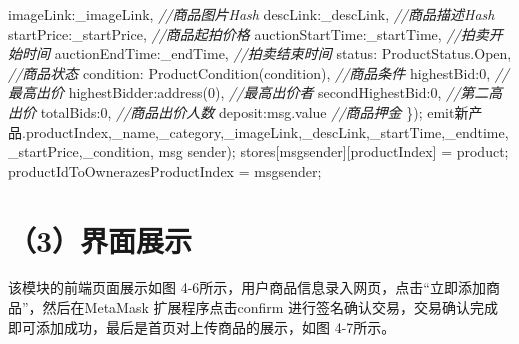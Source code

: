 \documentclass[
  10
]{article}
\newenvironment{Shaded}{}{}
\newcommand{\AttributeTok}[1]{\textcolor[rgb]{0.49,0.56,0.16}{#1}}
\newcommand{\CommentTok}[1]{\textcolor[rgb]{0.38,0.63,0.69}{\textit{#1}}}
\newcommand{\DecValTok}[1]{\textcolor[rgb]{0.25,0.63,0.44}{#1}}
\newcommand{\FunctionTok}[1]{\textcolor[rgb]{0.02,0.16,0.49}{#1}}
\newcommand{\NormalTok}[1]{#1}
\newcommand{\OperatorTok}[1]{\textcolor[rgb]{0.40,0.40,0.40}{#1}}
\begin{document}
\begin{Shaded}
\begin{Highlighting}[]
\NormalTok{imageLink}\OperatorTok{:}\NormalTok{\_imageLink}\OperatorTok{,} \CommentTok{//商品图片Hash  }
\NormalTok{descLink}\OperatorTok{:}\NormalTok{\_descLink}\OperatorTok{,} \CommentTok{//商品描述Hash  }
\NormalTok{startPrice}\OperatorTok{:}\NormalTok{\_startPrice}\OperatorTok{,} \CommentTok{//商品起拍价格  }
\NormalTok{auctionStartTime}\OperatorTok{:}\NormalTok{\_startTime}\OperatorTok{,} \CommentTok{//拍卖开始时间  }
\NormalTok{auctionEndTime}\OperatorTok{:}\NormalTok{\_endTime}\OperatorTok{,} \CommentTok{//拍卖结束时间  }
\NormalTok{status}\OperatorTok{:}\NormalTok{ ProductStatus}\OperatorTok{.}\AttributeTok{Open}\OperatorTok{,} \CommentTok{//商品状态  }
\NormalTok{condition}\OperatorTok{:} \FunctionTok{ProductCondition}\NormalTok{(condition)}\OperatorTok{,} \CommentTok{//商品条件  }
\NormalTok{highestBid}\OperatorTok{:}\DecValTok{0}\OperatorTok{,} \CommentTok{//最高出价  }
\NormalTok{highestBidder}\OperatorTok{:}\FunctionTok{address}\NormalTok{(}\DecValTok{0}\NormalTok{)}\OperatorTok{,} \CommentTok{//最高出价者  }
\NormalTok{secondHighestBid}\OperatorTok{:}\DecValTok{0}\OperatorTok{,} \CommentTok{//第二高出价  }
\NormalTok{totalBids}\OperatorTok{:}\DecValTok{0}\OperatorTok{,} \CommentTok{//商品出价人数  }
\NormalTok{deposit}\OperatorTok{:}\NormalTok{msg}\OperatorTok{.}\AttributeTok{value} \CommentTok{//商品押金  }
\NormalTok{\})}\OperatorTok{;}  
\NormalTok{emit新产品}\OperatorTok{.}\AttributeTok{productIndex}\OperatorTok{,}\NormalTok{\_name}\OperatorTok{,}\NormalTok{\_category}\OperatorTok{,}\NormalTok{\_imageLink}\OperatorTok{,}\NormalTok{\_descLink}\OperatorTok{,}\NormalTok{\_startTime}\OperatorTok{,}\NormalTok{\_endtime}\OperatorTok{,}\NormalTok{\_startPrice}\OperatorTok{,}\NormalTok{\_condition}\OperatorTok{,}\NormalTok{ msg sender)}\OperatorTok{;}  
\NormalTok{stores[msgsender][productIndex] }\OperatorTok{=}\NormalTok{ product}\OperatorTok{;}  
\NormalTok{productIdToOwnerazesProductIndex }\OperatorTok{=}\NormalTok{ msgsender}\OperatorTok{;}
\end{Highlighting}
\end{Shaded}

\section{（3）界面展示}\label{ux754cux9762ux5c55ux793a-1}

该模块的前端页面展示如图
4-6所示，用户商品信息录入网页，点击``立即添加商品''，然后在MetaMask
扩展程序点击confirm
进行签名确认交易，交易确认完成即可添加成功，最后是首页对上传商品的展示，如图
4-7所示。
\end{document}
